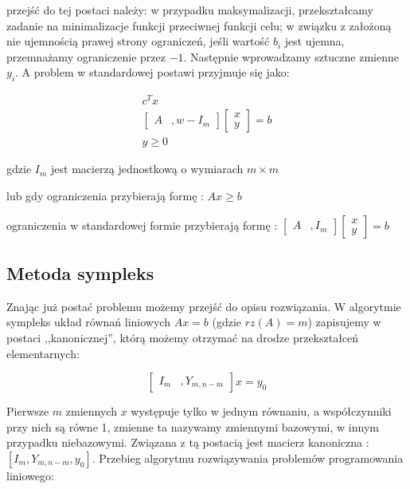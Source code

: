 \documentclass{classrep}
\begin{document}
przejść do tej postaci należy: w przypadku maksymalizacji, przekształcamy zadanie na minimalizacje funkcji przeciwnej funkcji celu; w związku z założoną nie ujemnością prawej strony ograniczeń, jeśli wartość $b_i$ jest ujemna, przemnażamy ograniczenie przez $-1$. Następnie wprowadzamy sztuczne zmienne $y_i$. A problem w standardowej postawi przyjmuje się jako:

\begin{align}
c^{T}x \nonumber \\
\left[ \begin{smallmatrix} A &,w -I_m \end{smallmatrix} \right] \left[ \begin{smallmatrix} x\\y \end{smallmatrix} \right] = b \nonumber \\
y \geq 0
\end{align}

gdzie $I_m$ jest macierzą jednostkową o wymiarach $m \times m$

lub gdy ograniczenia przybierają formę : $Ax \geq b$

ograniczenia w standardowej formie przybierają formę : 
$\left[ \begin{smallmatrix} A &, I_m \end{smallmatrix} \right] \left[ \begin{smallmatrix} x\\y \end{smallmatrix} \right] = b$

\subsection{Metoda sympleks}

Znając już postać problemu możemy przejść do opisu rozwiązania. W algorytmie sympleks układ równań liniowych $Ax=b$ (gdzie $rz(A)=m$) zapisujemy w postaci ,,kanonicznej'', którą możemy otrzymać na drodze przekształceń elementarnych:

$$\left[ \begin{smallmatrix} I_m &, Y_{m,n-m} \end{smallmatrix} \right] x = y_0 $$

Pierwsze $m$ zmiennych $x$ występuje tylko w jednym równaniu, a współczynniki przy nich są równe 1, zmienne ta nazywamy zmiennymi bazowymi, w innym przypadku niebazowymi. Związana z tą postacią jest macierz kanoniczna : $\left[  I_m , Y_{m,n-m}, y_0 \right] $. Przebieg algorytmu rozwiązywania problemów programowania liniowego:
\end{document}
